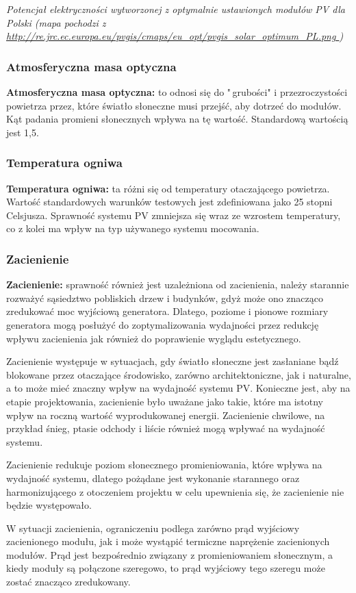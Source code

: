 \documentclass[12pt,a4paper]{article}
\begin{document}
\textit{Potencjał elektryczności wytworzonej z optymalnie ustawionych 
modułów PV dla Polski (mapa pochodzi z \underline{
http://re.jrc.ec.europa.eu/pvgis/cmaps/eu\_opt/pvgis\_solar\_optimum\_PL.png
}) }

\subsubsection{Atmosferyczna masa optyczna}
\textbf{Atmosferyczna masa optyczna:} to odnosi się do "\,grubości" i przezroczystości powietrza przez, które światło słoneczne musi przejść, aby dotrzeć do modułów. Kąt padania promieni słonecznych wpływa na tę wartość. Standardową wartością jest 1,5. 
\subsubsection{Temperatura ogniwa}
\textbf{Temperatura ogniwa:} ta różni się od temperatury otaczającego powietrza. Wartość standardowych warunków testowych jest zdefiniowana jako 25 stopni Celsjusza. Sprawność systemu PV zmniejsza się wraz ze wzrostem temperatury, co z kolei ma wpływ na typ używanego systemu mocowania. 
\subsubsection{Zacienienie}
\textbf{Zacienienie:} sprawność również jest uzależniona od zacienienia, należy starannie rozważyć sąsiedztwo pobliskich drzew i budynków, gdyż może ono znacząco zredukować moc wyjściową generatora. Dlatego, poziome i pionowe rozmiary generatora mogą posłużyć do zoptymalizowania wydajności przez redukcję wpływu zacienienia jak również do poprawienie wyglądu estetycznego. 

Zacienienie występuje w sytuacjach, gdy światło słoneczne jest 
zasłaniane bądź blokowane przez otaczające środowisko, zarówno 
architektoniczne, jak i naturalne, a to może mieć znaczny wpływ na 
wydajność systemu PV. Konieczne jest, aby na etapie projektowania, 
zacienienie było uważane jako takie, które ma istotny wpływ na roczną 
wartość wyprodukowanej energii. Zacienienie chwilowe, na przykład śnieg, 
ptasie odchody i liście również mogą wpływać na wydajność systemu. 

Zacienienie redukuje poziom słonecznego promieniowania, które wpływa na 
wydajność systemu, dlatego pożądane jest wykonanie starannego oraz 
harmonizującego z otoczeniem projektu w celu upewnienia się, że 
zacienienie nie będzie występowało. 

W sytuacji zacienienia, ograniczeniu podlega zarówno prąd wyjściowy 
zacienionego modułu, jak i może wystąpić termiczne naprężenie 
zacienionych modułów. Prąd jest bezpośrednio związany z 
promieniowaniem słonecznym, a kiedy moduły są połączone szeregowo, to 
prąd wyjściowy tego szeregu może zostać znacząco zredukowany. 
\end{document}

